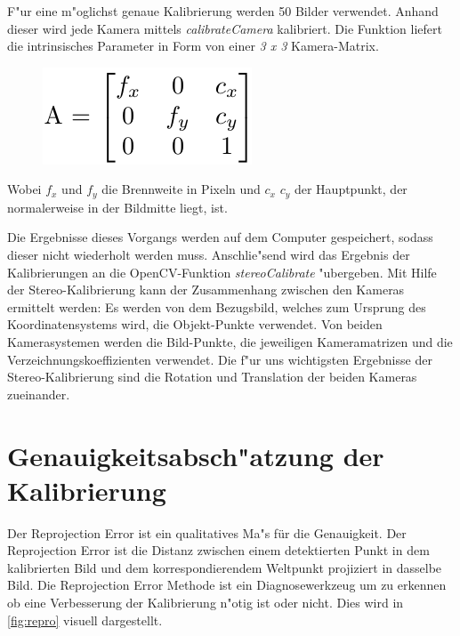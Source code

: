 \noindent F"ur eine m"oglichst genaue Kalibrierung werden 50 Bilder verwendet. Anhand dieser wird jede Kamera mittels \textit{calibrateCamera} kalibriert.\newline
Die Funktion liefert die intrinsisches Parameter in Form von einer \textit{3 x 3} Kamera-Matrix.

\begin{figure}[H]
	\centering
	\includegraphics[scale=0.75]{bilder/matrix}
\end{figure}

\noindent Wobei $f_{x}$ und $f_{y}$ die Brennweite in Pixeln und $c_{x}$ $c_{y}$ der Hauptpunkt, der normalerweise in der Bildmitte liegt, ist.

\noindent Die Ergebnisse dieses Vorgangs werden auf dem Computer gespeichert, sodass dieser nicht wiederholt werden muss. Anschlie"send wird das Ergebnis der Kalibrierungen an die OpenCV-Funktion \textit{stereoCalibrate} "ubergeben.\newline
Mit Hilfe der Stereo-Kalibrierung kann der Zusammenhang zwischen den Kameras ermittelt werden: Es werden von dem Bezugsbild, welches zum Ursprung des Koordinatensystems wird, die Objekt-Punkte verwendet. Von beiden Kamerasystemen werden die Bild-Punkte, die jeweiligen Kameramatrizen und die Verzeichnungskoeffizienten verwendet. Die f"ur uns wichtigsten Ergebnisse der Stereo-Kalibrierung sind die Rotation und Translation der beiden Kameras zueinander.

\section{Genauigkeitsabsch"atzung der Kalibrierung}
\label{sec:fehlertest}

Der Reprojection Error ist ein qualitatives Ma"s für die Genauigkeit. Der Reprojection Error ist die Distanz zwischen einem detektierten Punkt in dem kalibrierten Bild und dem korrespondierendem Weltpunkt projiziert in dasselbe Bild. Die Reprojection Error Methode ist ein Diagnosewerkzeug um zu erkennen ob eine Verbesserung der Kalibrierung n"otig ist oder nicht. Dies wird in \ref{fig:repro} visuell dargestellt.

